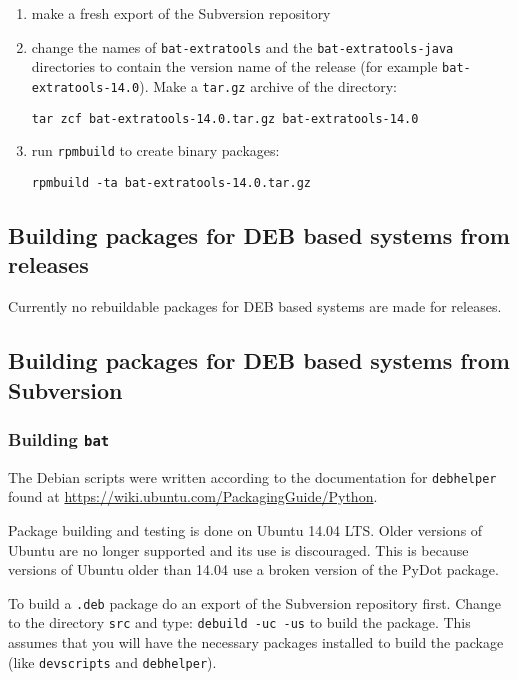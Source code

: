 \documentclass[10pt,a4paper]{article}
\begin{document}
\begin{enumerate}
\item make a fresh export of the Subversion repository
\item change the names of \texttt{bat-extratools} and the
\texttt{bat-extratools-java} directories to contain the version name of the
release (for example \texttt{bat-extratools-14.0}). Make a \texttt{tar.gz}
archive of the directory:

\begin{verbatim}
tar zcf bat-extratools-14.0.tar.gz bat-extratools-14.0
\end{verbatim}

\item run \texttt{rpmbuild} to create binary packages:

\begin{verbatim}
rpmbuild -ta bat-extratools-14.0.tar.gz
\end{verbatim}
\end{enumerate}

\subsection{Building packages for DEB based systems from releases}

Currently no rebuildable packages for DEB based systems are made for releases.

\subsection{Building packages for DEB based systems from Subversion}

\subsubsection{Building \texttt{bat}}

The Debian scripts were written according to the documentation for
\texttt{debhelper} found at \url{https://wiki.ubuntu.com/PackagingGuide/Python}.

Package building and testing is done on Ubuntu 14.04 LTS. Older versions of
Ubuntu are no longer supported and its use is discouraged. This is because
versions of Ubuntu older than 14.04 use a broken version of the PyDot package.

To build a \texttt{.deb} package do an export of the Subversion repository
first.  Change to the directory \texttt{src} and type:
\texttt{debuild -uc -us} to build the package. This assumes that you will have
the necessary packages installed to build the package (like \texttt{devscripts}
and \texttt{debhelper}).
\end{document}

